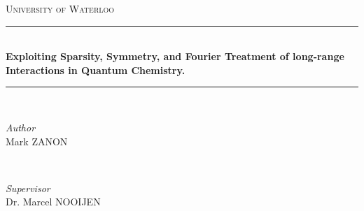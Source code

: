 \begin{titlepage} %
	\newcommand{\HRule}{\rule{\linewidth}{0.5mm}} %
	
	\center %
	
	
	\textsc{\LARGE University of Waterloo}\\[1.5cm] %
	
	
	
	\HRule\\[0.4cm]
	
	{\huge\bfseries Exploiting Sparsity, Symmetry, and Fourier Treatment of long-range Interactions in Quantum Chemistry.  } \\ %
	
	\HRule\\[1.5cm]
	
	
	
	\begin{minipage}{0.4\textwidth}
		\begin{flushleft}
			\large
			\textit{Author}\\
			Mark \textsc{ZANON} %
		\end{flushleft}
	\end{minipage}
	~
	\begin{minipage}{0.4\textwidth}
		\begin{flushright}
			\large
			\textit{Supervisor}\\
			Dr. Marcel \textsc{NOOIJEN} %
		\end{flushright}
	\end{minipage}
	\vfill\vfill\vfill

	
	

\end{titlepage}
